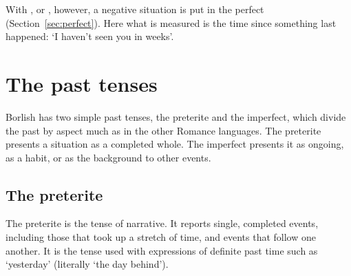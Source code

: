With ,  or , however, a negative situation is put in the perfect (Section~\ref{sec:perfect}). Here what is measured is the time since something last happened:  `I haven't seen you in weeks'.

\section{The past tenses}\label{sec:past-tenses}
Borlish has two simple past tenses, the preterite and the imperfect, which divide the past by aspect much as in the other Romance languages. The preterite presents a situation as a completed whole. The imperfect presents it as ongoing, as a habit, or as the background to other events.

\subsection{The preterite}\label{sec:preterite}
The preterite is the tense of narrative. It reports single, completed events, including those that took up a stretch of time, and events that follow one another. It is the tense used with expressions of definite past time such as  `yesterday' (literally `the day behind').

